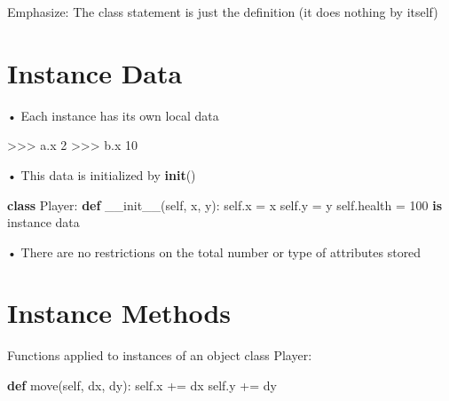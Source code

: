 \documentclass[
  letterpaper,
  DIV=11,
  numbers=noendperiod]{scrreprt}
\newenvironment{Shaded}{\begin{snugshade}}{\end{snugshade}}
\newcommand{\DecValTok}[1]{\textcolor[rgb]{0.68,0.00,0.00}{#1}}
\newcommand{\FunctionTok}[1]{\textcolor[rgb]{0.28,0.35,0.67}{#1}}
\newcommand{\KeywordTok}[1]{\textcolor[rgb]{0.00,0.23,0.31}{\textbf{#1}}}
\newcommand{\NormalTok}[1]{\textcolor[rgb]{0.00,0.23,0.31}{#1}}
\newcommand{\OperatorTok}[1]{\textcolor[rgb]{0.37,0.37,0.37}{#1}}
\newcommand{\VariableTok}[1]{\textcolor[rgb]{0.07,0.07,0.07}{#1}}
\begin{document}
Emphasize: The class statement is just the definition (it does nothing
by itself)


\chapter{Instance Data}\label{instance-data}

• Each instance has its own local data

\begin{Shaded}
\begin{Highlighting}[]
\NormalTok{\textgreater{}\textgreater{}\textgreater{} a.x 2   }
\NormalTok{\textgreater{}\textgreater{}\textgreater{} b.x 10 }
\end{Highlighting}
\end{Shaded}

• This data is initialized by \textbf{init}()

\begin{Shaded}
\begin{Highlighting}[]
\KeywordTok{class}\NormalTok{ Player: }\KeywordTok{def} \FunctionTok{\_\_init\_\_}\NormalTok{(}\VariableTok{self}\NormalTok{, x, y):  }
    \VariableTok{self}\NormalTok{.x }\OperatorTok{=}\NormalTok{ x  }
    \VariableTok{self}\NormalTok{.y }\OperatorTok{=}\NormalTok{ y  }
    \VariableTok{self}\NormalTok{.health }\OperatorTok{=} \DecValTok{100}  
\KeywordTok{is}\NormalTok{ instance data }
\end{Highlighting}
\end{Shaded}

• There are no restrictions on the total number or type of attributes
stored


\chapter{Instance Methods}\label{instance-methods}

Functions applied to instances of an object class Player:

\begin{Shaded}
\begin{Highlighting}[]
\KeywordTok{def}\NormalTok{ move(}\VariableTok{self}\NormalTok{, dx, dy): }\VariableTok{self}\NormalTok{.x }\OperatorTok{+=}\NormalTok{ dx }\VariableTok{self}\NormalTok{.y }\OperatorTok{+=}\NormalTok{ dy }
\end{Highlighting}
\end{Shaded}
\end{document}
